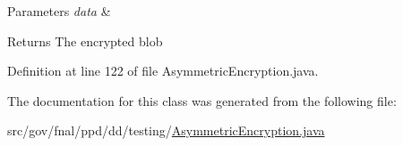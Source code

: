 \begin{DoxyParams}{Parameters}
{\em data} & \\
\hline
\end{DoxyParams}
\begin{DoxyReturn}{Returns}
The encrypted blob 
\end{DoxyReturn}


Definition at line 122 of file Asymmetric\-Encryption.\-java.



The documentation for this class was generated from the following file\-:\begin{DoxyCompactItemize}
\item 
src/gov/fnal/ppd/dd/testing/\hyperlink{AsymmetricEncryption_8java}{Asymmetric\-Encryption.\-java}\end{DoxyCompactItemize}

